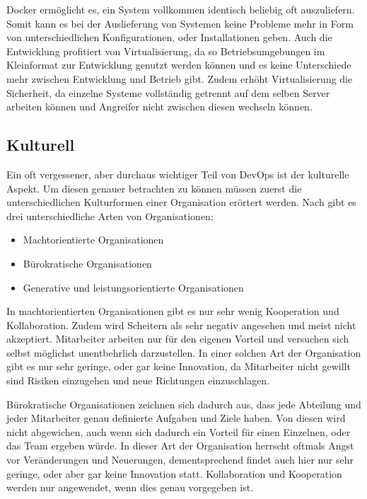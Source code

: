Docker ermöglicht es, ein System vollkommen identisch beliebig oft auszuliefern. 
Somit kann es bei der Auslieferung von Systemen keine Probleme mehr in Form von unterschiedlichen Konfigurationen, oder Installationen geben. 
Auch die Entwicklung profitiert von Virtualisierung, da so Betriebsumgebungen im Kleinformat zur Entwicklung genutzt werden können und es keine Unterschiede mehr zwischen Entwicklung und Betrieb gibt.
Zudem erhöht Virtualisierung die Sicherheit, da einzelne Systeme vollständig getrennt auf dem selben Server arbeiten können und Angreifer nicht zwischen diesen wechseln können. 
\parencite[Vgl.][S. 1 - 22]{matthias:2015}

\subsection{Kulturell}
Ein oft vergessener, aber durchaus wichtiger Teil von DevOps ist der kulturelle Aspekt. 
Um diesen genauer betrachten zu können müssen zuerst die unterschiedlichen Kulturformen einer Organisation erörtert werden.
Nach \parencite[][S. 2]{westrum:2004} gibt es drei unterschiedliche Arten von Organisationen:

\begin{itemize}
\item Machtorientierte Organisationen
\item Bürokratische Organisationen
\item Generative und leistungsorientierte Organisationen
\end{itemize}

In machtorientierten Organisationen gibt es nur sehr wenig Kooperation und Kollaboration.
Zudem wird Scheitern als sehr negativ angesehen und meist nicht akzeptiert. Mitarbeiter arbeiten nur für den eigenen Vorteil und versuchen sich selbst möglichst unentbehrlich darzustellen. 
In einer solchen Art der Organisation gibt es nur sehr geringe, oder gar keine Innovation, da Mitarbeiter nicht gewillt sind Risiken einzugehen und neue Richtungen einzuschlagen. \parencite[Vgl.][S. 2]{westrum:2004}

Bürokratische Organisationen zeichnen sich dadurch aus, dass jede Abteilung und jeder Mitarbeiter genau definierte Aufgaben und Ziele haben. 
Von diesen wird nicht abgewichen, auch wenn sich dadurch ein Vorteil für einen Einzelnen, oder das Team ergeben würde. 
In dieser Art der Organisation herrscht oftmals Angst vor Veränderungen und Neuerungen, dementsprechend findet auch hier nur sehr geringe, oder aber gar keine Innovation statt. Kollaboration und Kooperation werden nur angewendet, wenn dies genau vorgegeben ist. \parencite[Vgl.][S. 2]{westrum:2004}


